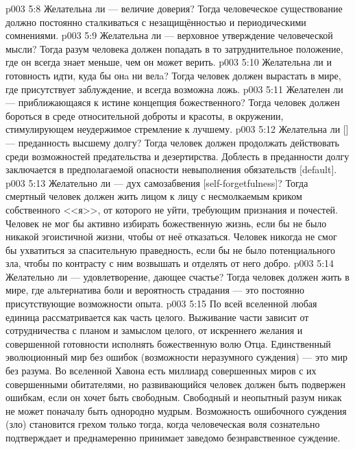 \vs p003 5:8 \bibnobreakspace Желательна ли  --- величие доверия? Тогда человеческое существование должно постоянно сталкиваться с незащищённостью и периодическими сомнениями.
\vs p003 5:9 \bibnobreakspace Желательна ли  --- верховное утверждение человеческой мысли? Тогда разум человека должен попадать в то затруднительное положение, где он всегда знает меньше, чем он может верить.
\vs p003 5:10 \bibnobreakspace Желательна ли  и готовность идти, куда бы онa ни велa? Тогда человек должен вырастать в мире, где присутствует заблуждение, и всегда возможна ложь.
\vs p003 5:11 \bibnobreakspace Желателен ли  --- приближающаяся к истине концепция божественного? Тогда человек должен бороться в среде относительной доброты и красоты, в окружении, стимулирующем неудержимое стремление к лучшему.
\vs p003 5:12 \bibnobreakspace Желательна ли  [] --- преданность высшему долгу? Тогда человек должен продолжать действовать среди возможностей предательства и дезертирства. Доблесть в преданности долгу заключается в предполагаемой опасности невыполнения обязательств [default].
\vs p003 5:13 \bibnobreakspace Желательно ли  --- дух самозабвения [self\hyp{}forgetfulness]? Тогда смертный человек должен жить лицом к лицу с несмолкаемым криком собственного <<я>>, от которого не уйти, требующим признания и почестей. Человек не мог бы активно избирать божественную жизнь, если бы не было никакой эгоистичной жизни, чтобы от неё отказаться. Человек никогда не смог бы ухватиться за спасительную праведность, если бы не было потенциального зла, чтобы по контрасту с ним возвышать и отделять от него добро.
\vs p003 5:14 \bibnobreakspace Желательно ли  --- удовлетворение, дающее счастье? Тогда человек должен жить в мире, где альтернатива боли и вероятность страдания --- это постоянно присутствующие возможности опыта.
\vs p003 5:15 \pc По всей вселенной любая единица рассматривается как часть целого. Выживание части зависит от сотрудничества с планом и замыслом целого, от искреннего желания и совершенной готовности исполнять божественную волю Отца. Единственный эволюционный мир без ошибок (возможности неразумного суждения) --- это мир без  разума. Во вселенной Хавона есть миллиард совершенных миров с их совершенными обитателями, но развивающийся человек должен быть подвержен ошибкам, если он хочет быть свободным. Свободный и неопытный разум никак не может поначалу быть однородно мудрым. Возможность ошибочного суждения (зло) становится грехом только тогда, когда человеческая воля сознательно подтверждает и преднамеренно принимает заведомо безнравственное суждение.
